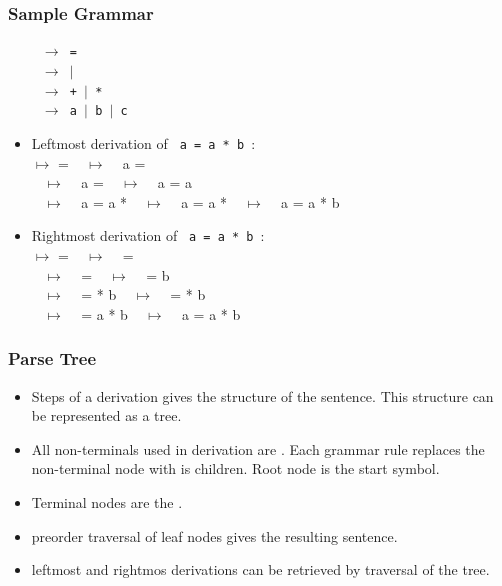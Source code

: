 \begin{frame}
\frametitle{Sample Grammar}
{\small
~~~ \texttt{ $\rightarrow$  = }\\
~~~ \texttt{ $\rightarrow$    $\mid$ }\\
~~~ \texttt{ $\rightarrow$ + $\mid$ *} \\
~~~ \texttt{ $\rightarrow$ a $\mid$ b $\mid$ c}
}
\begin{itemize}
\item Leftmost derivation of \texttt{ a = a * b }:\\
{\texttt \small
{} $\mapsto$  = 
~ $\mapsto$ ~ a = \\
~ $\mapsto$ ~ a =   
~ $\mapsto$ ~ a = a   \\
~ $\mapsto$ ~ a = a * 
~ $\mapsto$ ~ a = a * 
~ $\mapsto$ ~ a = a * b}
\item Rightmost derivation of \texttt{ a = a * b }:\\
{\texttt \small
{} $\mapsto$  =  
~ $\mapsto$ ~  =    \\
~ $\mapsto$ ~  =   
~ $\mapsto$ ~  =   b \\
~ $\mapsto$ ~  =  * b
~ $\mapsto$ ~  =  * b \\
~ $\mapsto$ ~  = a * b
~ $\mapsto$ ~ a = a * b
}
\end{itemize}
\end{frame}

\begin{frame}
\frametitle{Parse Tree}
\begin{itemize}
\item Steps of a derivation gives the structure of the sentence. This structure can be represented as a tree.
\item All non-terminals used in derivation are .
Each grammar rule replaces the non-terminal node with is children. Root node is the start symbol.
\item Terminal nodes are the .
\item preorder traversal of leaf nodes gives the resulting sentence.
\item leftmost and rightmos derivations can be retrieved by traversal of the tree.
\end{itemize}
\end{frame}


